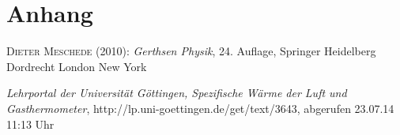 \documentclass[12pt,a4paper,titlepage,headinclude,bibtotoc]{scrartcl}
\begin{document}
\section{Anhang}

\begin{thebibliography}{100}

	\textsc{Dieter Meschede} (2010): \emph{Gerthsen Physik}, 24. Auflage, Springer Heidelberg
Dordrecht London New York

	\emph{Lehrportal der Universität Göttingen, Spezifische Wärme der Luft und Gasthermometer},
  http://lp.uni-goettingen.de/get/text/3643, abgerufen 23.07.14 11:13 Uhr

\end{thebibliography}
\end{document}
